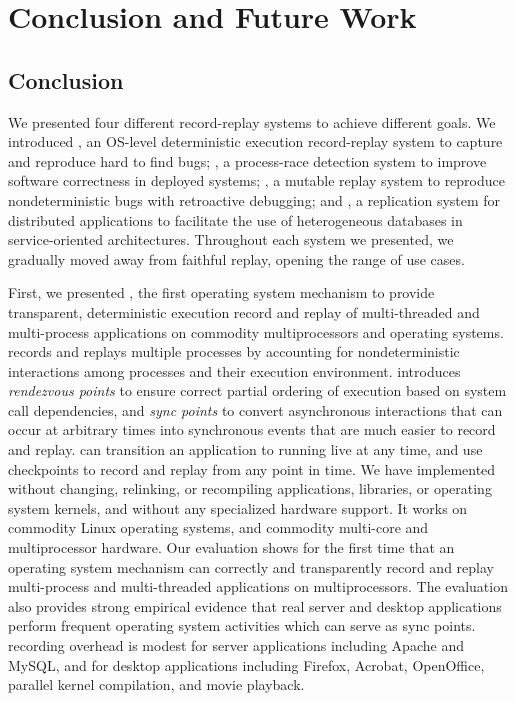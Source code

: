 \chapter{Conclusion and Future Work}
\label{ch:conclusion}

\section{Conclusion}

We presented four different record-replay systems to achieve different goals.
We introduced \scribe, an OS-level deterministic execution record-replay system
to capture and reproduce hard to find bugs; \racepro, a process-race detection
system to improve software correctness in deployed systems; \dora, a mutable
replay system to reproduce nondeterministic bugs with retroactive debugging;
and \synapse, a replication system for distributed
applications to facilitate the use of heterogeneous databases in
service-oriented architectures.
Throughout each system we presented, we gradually moved away from faithful
replay, opening the range of use cases.

First, we presented \scribe{}, the first operating system mechanism to provide
transparent, deterministic execution record and replay of multi-threaded and
multi-process applications on commodity multiprocessors and operating systems.
\scribe{} records and replays multiple processes by accounting for
nondeterministic interactions among processes and their execution environment.
\scribe{} introduces {\em rendezvous points} to ensure correct partial ordering
of execution based on system call dependencies, and {\em sync points} to convert
asynchronous interactions that can occur at arbitrary times into synchronous
events that are much easier to record and replay.  \scribe{} can transition an
application  to running live at any time, and use checkpoints to record and
replay from any point in time.
We have implemented \scribe{} without changing, relinking, or
recompiling applications, libraries, or operating system kernels, and
without any specialized hardware support. It works on commodity Linux
operating systems, and commodity multi-core and multiprocessor
hardware.  Our evaluation shows for the first time that an operating
system mechanism can correctly and transparently record and replay
multi-process and multi-threaded applications on multiprocessors.  The
evaluation also provides strong empirical evidence that 
real server and desktop applications perform frequent
operating system activities which can serve as sync points.
\scribe{} recording overhead is modest for server applications including Apache
and MySQL, and for desktop applications including Firefox, Acrobat, OpenOffice,
parallel kernel compilation, and movie playback.

